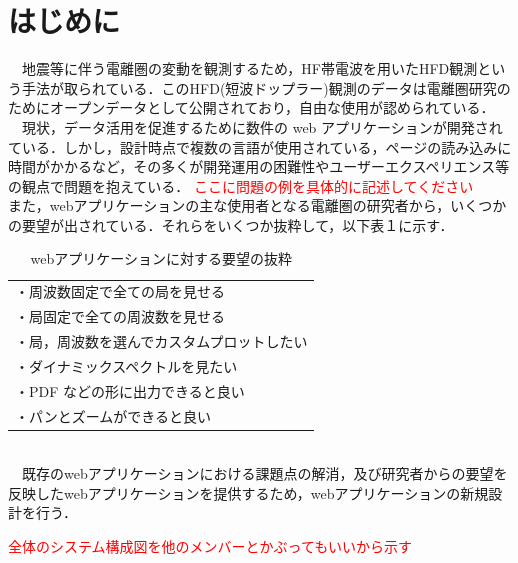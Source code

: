 \section{はじめに}

　地震等に伴う電離圏の変動を観測するため，HF帯電波を用いたHFD観測という手法が取られている．このHFD(短波ドップラー)観測のデータは電離圏研究のためにオープンデータとして公開されており，自由な使用が認められている．\cite{hfd_report}\\
　現状，データ活用を促進するために数件の web アプリケーションが開発されている．しかし，設計時点で複数の言語が使用されている，ページの読み込みに時間がかかるなど，その多くが開発運用の困難性やユーザーエクスペリエンス等の観点で問題を抱えている．
\textcolor{red}{ここに問題の例を具体的に記述してください}\\
また，webアプリケーションの主な使用者となる電離圏の研究者から，いくつかの要望が出されている．それらをいくつか抜粋して，以下表１に示す．\\
\begin{table}[h]
  \centering
  \caption{webアプリケーションに対する要望の抜粋}
  \begin{tabular}{l}
  \toprule
    ・周波数固定で全ての局を見せる\\
    ・局固定で全ての周波数を見せる\\
    ・局，周波数を選んでカスタムプロットしたい\\
    ・ダイナミックスペクトルを見たい\\
    ・PDF などの形に出力できると良い\\
    ・パンとズームができると良い
  \end{tabular}
\end{table}\\
　既存のwebアプリケーションにおける課題点の解消，及び研究者からの要望を反映したwebアプリケーションを提供するため，webアプリケーションの新規設計を行う．

\textcolor{red}{全体のシステム構成図を他のメンバーとかぶってもいいから示す}

